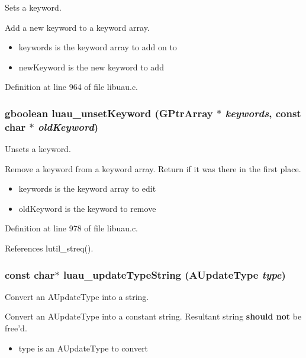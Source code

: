 Sets a keyword. 

Add a new keyword to a keyword array.

\begin{itemize}
\item keywords is the keyword array to add on to \item new\-Keyword is the new keyword to add \end{itemize}


Definition at line 964 of file libuau.c.
\subsubsection{\setlength{\rightskip}{0pt plus 5cm}gboolean luau\_\-unset\-Keyword (GPtr\-Array $\ast$ {\em keywords}, const char $\ast$ {\em old\-Keyword})}\label{libuau_8c_a32}


Unsets a keyword. 

Remove a keyword from a keyword array. Return if it was there in the first place.

\begin{itemize}
\item keywords is the keyword array to edit \item old\-Keyword is the keyword to remove 
\end{itemize}


Definition at line 978 of file libuau.c.

References lutil\_\-streq().
\subsubsection{\setlength{\rightskip}{0pt plus 5cm}const char$\ast$ luau\_\-update\-Type\-String ({\bf AUpdate\-Type} {\em type})}\label{libuau_8c_a28}


Convert an AUpdate\-Type into a string. 

Convert an AUpdate\-Type into a constant string. Resultant string {\bf should not} be free'd.

\begin{itemize}
\item type is an AUpdate\-Type to convert 
\end{itemize}


